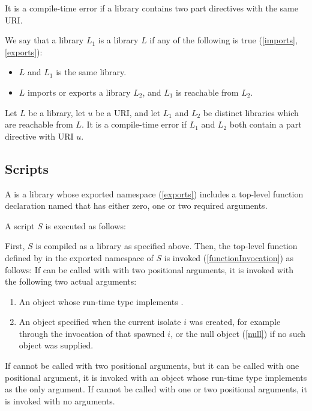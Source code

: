 \documentclass[makeidx]{article}
\begin{document}
{\LMHash{}%
It is a compile-time error if a library contains
two part directives with the same URI.

\LMHash{}%
We say that a library $L_1$ is  a library $L$ if
any of the following is true (\ref{imports}, \ref{exports}):
\begin{itemize}
\item $L$ and $L_1$ is the same library.
\item $L$ imports or exports a library $L_2$, and $L_1$ is reachable from $L_2$.
\end{itemize}

\LMHash{}%
Let $L$ be a library, let $u$ be a URI,
and let $L_1$ and $L_2$ be distinct libraries which are reachable from $L$.
It is a compile-time error if $L_1$ and $L_2$ both contain
a part directive with URI $u$.



\subsection{Scripts}

\LMHash{}%
A  is a library whose exported namespace (\ref{exports}) includes
a top-level function declaration named 
that has either zero, one or two required arguments.

A script $S$ is executed as follows:

\LMHash{}%
First, $S$ is compiled as a library as specified above.
Then, the top-level function defined by 
in the exported namespace of $S$ is invoked (\ref{functionInvocation})
as follows:
If  can be called with with two positional arguments,
it is invoked with the following two actual arguments:
\begin{enumerate}
\item An object whose run-time type implements .
\item An object specified when the current isolate $i$ was created,
for example through the invocation of  that spawned $i$,
or the null object (\ref{null}) if no such object was supplied.
\end{enumerate}
If  cannot be called with two positional arguments,
but it can be called with one positional argument,
it is invoked with an object whose run-time type implements 
as the only argument.
If  cannot be called with one or two positional arguments,
it is invoked with no arguments.

}
\end{document}
